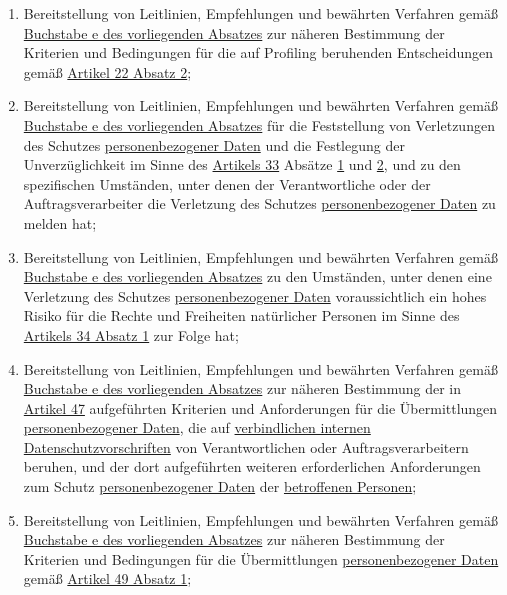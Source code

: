 \begin{enumerate}
\begin{enumerate}
    \item Bereitstellung von Leitlinien, Empfehlungen und bewährten Verfahren gemäß \hyperref[itm:70-1e]{Buchstabe e des
     vorliegenden Absatzes} zur näheren Bestimmung der Kriterien und Bedingungen für die auf Profiling beruhenden
     Entscheidungen gemäß \hyperref[itm:22-2]{Artikel 22 Absatz 2};
    \label{itm:70-1f}

    \item Bereitstellung von Leitlinien, Empfehlungen und bewährten Verfahren gemäß \hyperref[itm:70-1e]{Buchstabe e des
     vorliegenden Absatzes} für die Feststellung von Verletzungen des Schutzes \hyperref[itm:04-1]{personenbezogener Daten} und die
     Festlegung der Unverzüglichkeit im Sinne des \hyperref[ch:33]{Artikels 33} Absätze \hyperref[itm:33-1]{1} und
     \hyperref[itm:33-2]{2}, und zu den spezifischen Umständen, unter denen der Verantwortliche oder der
     Auftragsverarbeiter die Verletzung des Schutzes \hyperref[itm:04-1]{personenbezogener Daten} zu melden hat;
    \label{itm:70-1g}

    \item Bereitstellung von Leitlinien, Empfehlungen und bewährten Verfahren gemäß \hyperref[itm:70-1e]{Buchstabe e des
     vorliegenden Absatzes} zu den Umständen, unter denen eine Verletzung des Schutzes \hyperref[itm:04-1]{personenbezogener Daten}
     voraussichtlich ein hohes Risiko für die Rechte und Freiheiten natürlicher Personen im Sinne des \hyperref
     [itm:34-1]{Artikels 34 Absatz 1} zur Folge hat;
    \label{itm:70-1h}

    \item Bereitstellung von Leitlinien, Empfehlungen und bewährten Verfahren gemäß \hyperref[itm:70-1e]{Buchstabe e des
     vorliegenden Absatzes} zur näheren Bestimmung der in \hyperref[ch:47]{Artikel 47} aufgeführten Kriterien und
     Anforderungen für die Übermittlungen \hyperref[itm:04-1]{personenbezogener Daten}, die auf \hyperref[itm:04-20]{verbindlichen internen
     Datenschutzvorschriften} von Verantwortlichen oder Auftragsverarbeitern beruhen, und der dort aufgeführten weiteren
     erforderlichen Anforderungen zum Schutz \hyperref[itm:04-1]{personenbezogener Daten} der \hyperref[itm:04-1]{betroffenen Personen};
    \label{itm:70-1i}

    \item Bereitstellung von Leitlinien, Empfehlungen und bewährten Verfahren gemäß \hyperref[itm:70-1e]{Buchstabe e des
     vorliegenden Absatzes} zur näheren Bestimmung der Kriterien und Bedingungen für die Übermittlungen
     \hyperref[itm:04-1]{personenbezogener Daten} gemäß \hyperref[itm:49-1-1]{Artikel 49 Absatz 1};
    \label{itm:70-1j}


\end{enumerate}
\end{enumerate}
